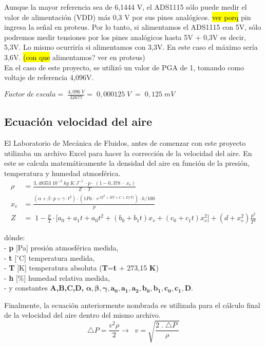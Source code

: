 Aunque la mayor referencia sea de 6,1444 V, el ADS1115 sólo puede medir el valor de alimentación (VDD) más 0,3 V por sus pines analógicos. \hl{ver porq} pin ingresa la señal en proteus. Por lo tanto, si alimentamos el ADS1115 con 5V, sólo podremos medir tensiones por los pines analógicos hasta 5V + 0,3V es decir, 5,3V. Lo mismo ocurriría si alimentamos con 3,3V. En este caso el máximo sería 3,6V. \hl{(con que} alimentamos? ver en proteus)\\
En el caso de este proyecto, se utilizó un valor de PGA de 1, tomando como voltaje de referencia 4,096V.
\begin{center}
	\begin{math}
		Factor\;de\;escala=\;\frac{4,096\;V}{32677}=\;0,000125\;V\;=\;0,125\;mV
	\end{math}
\end{center}

\subsection{Ecuación velocidad del aire}
El Laboratorio de Mecánica de Fluidos, antes de comenzar con este proyecto utilizaba un archivo Excel para hacer la corrección de la velocidad del aire. En este se calcula matemáticamente la densidad del aire en función de la presión, temperatura y humedad atmosférica.
\begin{align}
	\rho&=\frac{3,48353\;10^{-3}\;kg\;K\;J^{-1}\;\cdot p\cdot\;(1-0,378\;\cdot\;x_v)}{Z\;\cdot\;T} \label{ec_den}\\
	x_v&=\frac{(\alpha+\beta\cdot p+\gamma\cdot t^2)\cdot(1Pa\cdot\;e^{AT^2+BT+C+D/T)})\cdot h/100}p\\
	Z&=\;1-\frac pT\cdot\lbrack a_0+a_1t+a_0t^2+(b_0+b_1t)x_v+(c_0+c_1t)x_v^2\rbrack+(d+x_v^2)\frac{p^2}{T^2}
\end{align}

dónde:\\
- \textbf{p } [Pa] presión atmosférica medida,\\
- \textbf{t } [$^{\circ}$C] temperatura medida,\\
- \textbf{T } [K] temperatura absoluta (\textbf{T}=\textbf{t} + 273,15 \textbf{K})\\
- \textbf{h } [\%] humedad relativa medida,\\
- y constantes \textbf{A,B,C,D,} $\boldsymbol{\alpha , \beta  , \gamma , a_0, a_1 ,a_2 ,b_0  ,b_1 , c_0 , c_1, D. }$


Finalmente, la ecuación anteriormente nombrada es utilizada para el cálculo final de la velocidad del aire dentro del mismo archivo.
\begin{equation}
	\triangle P=\frac{v^2\rho}2\rightarrow\;\;v=\sqrt{\frac{2\;.\;\triangle P\;}\rho}
	\label{ec_aire}
\end{equation}

